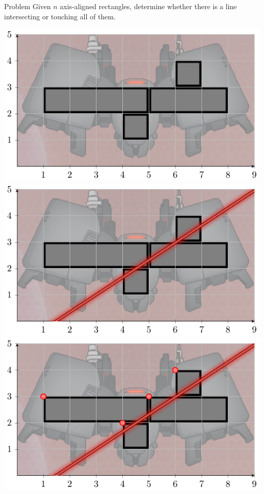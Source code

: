\begin{frame}
    \frametitle{\problemtitle}
    \begin{block}{Problem}
        Given $n$ axis-aligned rectangles, determine whether there is a line
        intersecting or touching all of them.
    \end{block}
	\begin{overprint}
		\centering
		\includegraphics[height=0.4\textheight]{example1}
		\onslide<2|handout:0>
		\centering
		\includegraphics[height=0.4\textheight]{example2}
		\onslide<3|handout:0>
		\centering
		\includegraphics[height=0.4\textheight]{example3}

\end{overprint}
\end{frame}
